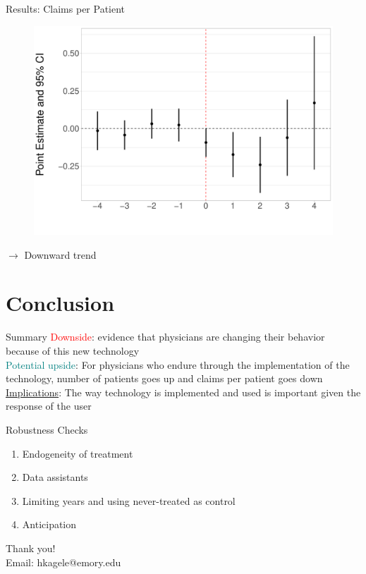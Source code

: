 \documentclass[10pt]{beamer}
\begin{document}
\begin{frame}{Results: Claims per Patient}
\begin{figure}[ht]
\centering
\includegraphics[scale=.35]{Objects/Presentation_claimperpatient_all.pdf}
\end{figure}
$\rightarrow$ Downward trend
\end{frame}



\section{Conclusion}


\begin{frame}{Summary}
\textcolor{red}{Downside}: evidence that physicians are changing their behavior because of this new technology\\
                \vspace{6mm}
\textcolor{teal}{Potential upside}: For physicians who endure through the implementation of the technology, number of patients goes up and claims per patient goes down\\
                \vspace{6mm}
\underline{Implications}: The way technology is implemented and used is important given the response of the user

\end{frame}

\begin{frame}{Robustness Checks}
\begin{enumerate}
    \item Endogeneity of treatment
            \vspace{3mm}
    \item Data assistants
            \vspace{3mm}
    \item Limiting years and using never-treated as control
            \vspace{3mm}
    \item Anticipation
\end{enumerate}
\end{frame}


\begin{frame}[plain]{}
\centering
    Thank you! \\
    \vspace{5mm}
    Email: hkagele@emory.edu
\end{frame}
\end{document}
